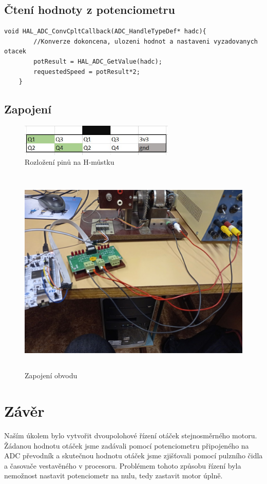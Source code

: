 \documentclass[12pt,a4paper]{article}
\begin{document}
\subsection*{Čtení hodnoty z potenciometru}
\begin{lstlisting}[style=CStyle]
	void HAL_ADC_ConvCpltCallback(ADC_HandleTypeDef* hadc){
		//Konverze dokoncena, ulozeni hodnot a nastaveni vyzadovanych otacek
		potResult = HAL_ADC_GetValue(hadc);
		requestedSpeed = potResult*2;
	}
\end{lstlisting}
\subsection*{Zapojení}
\begin{figure}[h]
	\centering
	\includegraphics[height=1.5cm]{pins}
	\caption{Rozložení pinů na H-můstku}
	\label{pins}
\end{figure}
\begin{figure}[h]
	\centering
	\includegraphics[height=10cm]{zapojeni}
	\caption{Zapojení obvodu}
	\label{zapoj}
\end{figure}

\newpage
\section{Závěr}
Naším úkolem bylo vytvořit dvoupolohové řízení otáček stejnosměrného motoru. Žádanou hodnotu otáček jsme zadávali pomocí potenciometru připojeného na ADC převodník a skutečnou hodnotu otáček jsme zjišťovali pomocí pulzního čidla a časovače vestavěného v procesoru. Problémem tohoto způsobu řízení byla nemožnost nastavit potenciometr na nulu, tedy zastavit motor úplně.
\end{document}
